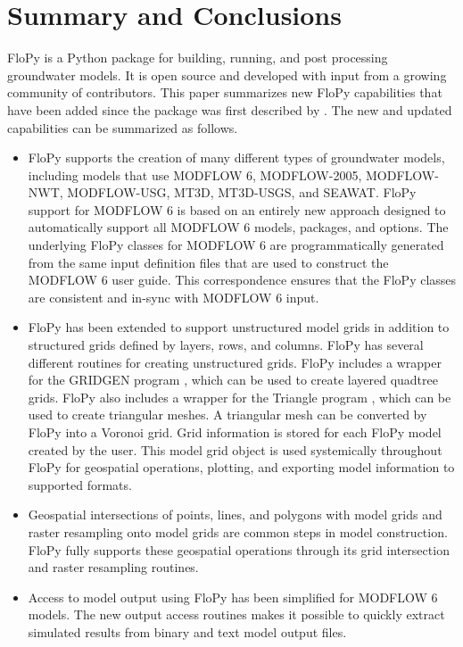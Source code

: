 \documentclass[12pt, oneside]{article}  	%
\begin{document}
\section*{Summary and Conclusions} \label{sec:summary}
FloPy is a Python package for building, running, and post processing groundwater models. It is open source and developed with input from a growing community of contributors. This paper summarizes new FloPy capabilities that have been added since the package was first described by \cite{bakker2016scripting}. The new and updated capabilities can be summarized as follows.

\begin{itemize}
\item FloPy supports the creation of many different types of groundwater models, including models that use MODFLOW 6, MODFLOW-2005, MODFLOW-NWT, MODFLOW-USG, MT3D, MT3D-USGS, and SEAWAT. FloPy support for MODFLOW 6 is based on an entirely new approach designed to automatically support all MODFLOW 6 models, packages, and options. The underlying FloPy classes for MODFLOW 6 are programmatically generated from the same input definition files that are used to construct the MODFLOW 6 user guide. This correspondence ensures that the FloPy classes are consistent and in-sync with MODFLOW 6 input.

\item FloPy has been extended to support unstructured model grids in addition to structured grids defined by layers, rows, and columns. FloPy has several different routines for creating unstructured grids. FloPy includes a wrapper for the GRIDGEN program \citep{gridgen}, which can be used to create layered quadtree grids. FloPy also includes a wrapper for the Triangle program \citep{trianglemesh}, which can be used to create triangular meshes. A triangular mesh can be converted by FloPy into a Voronoi grid. Grid information is stored for each FloPy model created by the user. This model grid object is used systemically throughout FloPy for geospatial operations, plotting, and exporting model information to supported formats.

\item Geospatial intersections of points, lines, and polygons with model grids and raster resampling onto model grids are common steps in model construction. FloPy fully supports these geospatial operations through its grid intersection and raster resampling routines.

\item Access to model output using FloPy has been simplified for MODFLOW 6 models. The new output access routines makes it possible to quickly extract simulated results from binary and text model output files.


\end{itemize}
\end{document}
